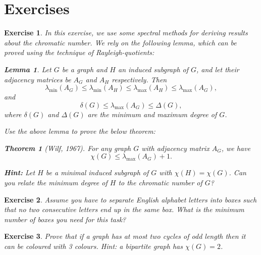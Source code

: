 \documentclass[nobib]{tufte-handout}
\newtheorem{lemma}{Lemma}
\newtheorem{theorem}{Theorem}
\newtheorem{xca}{Exercise}
\begin{document}
\section{Exercises}

\begin{xca}
  In this exercise, we use some \emph{spectral} methods for deriving results about the chromatic number. We rely on the following lemma, which can be proved using the technique of Rayleigh-quotients:

  \begin{lemma}
    Let $G$ be a graph and $H$ an induced subgraph of $G$, and let their adjacency matrices be $A_G$ and $A_H$ respectively. Then
    $$\lambda_{\min}\left(A_G\right) \leq \lambda_{\min}\left(A_H\right) \leq \lambda_{\max}\left(A_H\right) \leq \lambda_{\max}\left(A_G\right),$$
    and
    $$\delta(G) \leq \lambda_{\max}\left(A_G\right) \leq \Delta(G),$$
    where $\delta(G)$ and $\Delta(G)$ are the minimum and maximum degree of $G$.
  \end{lemma}

  Use the above lemma to prove the below theorem:
  \begin{theorem}[Wilf, 1967]
    For any graph $G$ with adjacency matrix $A_G$, we have
    $$\chi(G) \leq \lambda_{\max}\left(A_G\right) + 1.$$
  \end{theorem}

  \textbf{Hint:} Let $H$ be a minimal induced subgraph of $G$ with $\chi(H) = \chi(G)$. Can you relate the minimum degree of $H$ to the chromatic number of $G$?
\end{xca}

\begin{xca}
Assume you have to separate English alphabet letters into boxes such that no two consecutive letters end up in the same box. What is the minimum number of boxes you need for this task?
\end{xca}

\begin{xca}
Prove that if a graph has at most two cycles of odd length then it can be
coloured with 3 colours. \textit{Hint}: a bipartite graph has $\chi(G) = 2$.
\end{xca}


%
%
\end{document}
